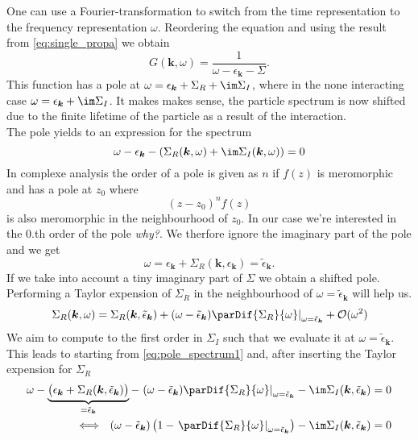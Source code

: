 \documentclass[../main.tex]{subfile}
\begin{document}
One can use a Fourier-transformation to switch from the time representation to the frequency representation $\omega$. Reordering the equation and using the result
from \ref{eq:single_propa} we obtain
\[
    G(\bm{k},\omega) = \frac{1}{\omega - \epsilon_{\bm{k}} - \Sigma}.
\]
This function has a pole at $\omega = \epsilon_{\bm{k}} + \Sigma_R + \im \Sigma_I$, where in the none interacting case $\omega = \epsilon_{\bm{k}} + \im\Sigma_I$.
It makes makes sense, the particle spectrum is now shifted due to the finite lifetime of the particle as a result of the interaction.\\
The pole yields to an expression for the spectrum
\begin{equation} \label{eq:pole_spectrum1}
    \omega - \epsilon_{\bm{k}} - \left(\Sigma_R(\bm{k},\omega) + \im \Sigma_I(\bm{k},\omega)\right) = 0
\end{equation}
In complexe analysis the order of a pole is given as $n$ if $f(z)$ is meromorphic and has a pole at $z_0$ where
\[
    (z-z_0)^n f(z)
\]
is also meromorphic in the neighbourhood of $z_0$. In our case we're interested in the 0.th order of the pole \textit{why?}. 
We therfore ignore the imaginary part of the pole and we get
\[
    \omega = \epsilon_{\bm{k}} + \Sigma_R(\bm{k}, \epsilon_{\bm{k}}) = \tilde{\epsilon}_{\bm{k}}.  
\]
If we take into account a tiny imaginary part of $\Sigma$ we obtain a shifted pole. Performing a Taylor expension of 
$\Sigma_{R}$ in the neighbourhood of $\omega = \tilde{\epsilon}_{\bm{k}}$ will help us.
\begin{equation*}
    \left.\Sigma_R(\bm{k}, \omega) = \Sigma_R(\bm{k}, \tilde{\epsilon}_{\bm{k}}) + (\omega - \tilde{\epsilon}_{\bm{k}}) \parDif{\Sigma_R}{\omega}\right|_{\omega= \tilde{\epsilon}_{\bm{k}}} + \mathcal{O}(\omega^2)
\end{equation*}
We aim to compute to the first order in $\Sigma_I$ such that we evaluate it at $\omega = \tilde{\epsilon}_{\bm{k}}$. 
This leads to starting from \ref{eq:pole_spectrum1} and, after inserting the Taylor expension for $\Sigma_R$
\begin{equation}
    \begin{aligned}
        \omega - \underbrace{\bigl(\epsilon_{\bm{k}} + \Sigma_R(\bm{k}, \tilde{\epsilon}_{\bm{k}})\bigr)}_{=  \tilde{\epsilon}_{\bm{k}}} 
        - \left.(\omega - \tilde{\epsilon}_{\bm{k}}) \parDif{\Sigma_R}{\omega}\right|_{\omega= \tilde{\epsilon}_{\bm{k}}} - \im \Sigma_I(\bm{k}, \tilde{\epsilon}_{\bm{k}}) &= 0\\
        \Longleftrightarrow ~~ (\omega - \tilde{\epsilon}_{\bm{k}}) \left(1 - \left.\parDif{\Sigma_R}{\omega}\right|_{\omega= \tilde{\epsilon}_{\bm{k}}}\right) - \im \Sigma_I(\bm{k}, \tilde{\epsilon}_{\bm{k}}) &= 0
    \end{aligned}
\end{equation}
\end{document}
